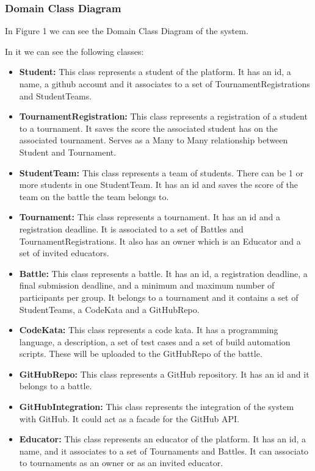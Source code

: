 \documentclass{article}
\begin{document}
\subsubsection{Domain Class Diagram}

In Figure 1 we can see the Domain Class Diagram of the system.

In it we can see the following classes:

\begin{itemize}
    \item \textbf{Student:} This class represents a student of the platform. It has an id, a name, a github account and it associates to a set of TournamentRegistrations and StudentTeams.
    \item \textbf{TournamentRegistration:} This class represents a registration of a student to a tournament. It saves the score the associated student has on the associated tournament. Serves as a Many to Many relationship between Student and Tournament.
    \item \textbf{StudentTeam:} This class represents a team of students. There can be 1 or more students in one StudentTeam. It has an id and saves the score of the team on the battle the team belongs to.
    \item \textbf{Tournament:} This class represents a tournament. It has an id and a registration deadline. It is associated to a set of Battles and TournamentRegistrations. It also has an owner which is an Educator and a set of invited educators.
    \item \textbf{Battle:} This class represents a battle. It has an id, a registration deadline, a final submission deadline, and a minimum and maximum number of participants per group. It belongs to a tournament and it contains a set of StudentTeams, a CodeKata and a GitHubRepo.
    \item \textbf{CodeKata:} This class represents a code kata. It has a programming language, a description, a set of test cases and a set of build automation scripts. These will be uploaded to the GitHubRepo of the battle. 
    \item \textbf{GitHubRepo:} This class represents a GitHub repository. It has an id and it belongs to a battle. 
    \item \textbf{GitHubIntegration:} This class represents the integration of the system with GitHub. It could act as a facade for the GitHub API.
    \item \textbf{Educator:} This class represents an educator of the platform. It has an id, a name, and it associates to a set of Tournaments and Battles. It can associato to tournaments as an owner or as an invited educator. 
\end{itemize}
\end{document}
